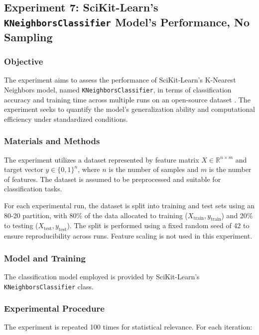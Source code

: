 \documentclass{article}
\theoremstyle{plain}
\theoremstyle{definition}
\theoremstyle{remark}
\begin{document}
\subsection{Experiment 7: SciKit-Learn's \texttt{KNeighborsClassifier} Model's Performance, No Sampling}

\subsubsection{Objective}

The experiment aims to assess the performance of SciKit-Learn's K-Nearest Neighbors model, named \texttt{KNeighborsClassifier}, in terms of classification accuracy and training time across multiple runs on an open-source dataset \cite{iris}. The experiment seeks to quantify the model's generalization ability and computational efficiency under standardized conditions.


\subsubsection{Materials and Methods}

The experiment utilizes a dataset represented by feature matrix $ X \in \mathbb{R}^{n \times m} $ and target vector $ y \in \{0, 1\}^n $, where $ n $ is the number of samples and $ m $ is the number of features. The dataset is assumed to be preprocessed and suitable for classification tasks.

For each experimental run, the dataset is split into training and test sets using an 80-20 partition, with 80\% of the data allocated to training ($ X_{\text{train}}, y_{\text{train}} $) and 20\% to testing ($ X_{\text{test}}, y_{\text{test}} $). The split is performed using a fixed random seed of 42 to ensure reproducibility across runs. Feature scaling is not used in this experiment.


\subsubsection{Model and Training}

The classification model employed is provided by SciKit-Learn's \texttt{KNeighborsClassifier} class.


\subsubsection{Experimental Procedure}

The experiment is repeated 100 times for statistical relevance. For each iteration:
\end{document}
